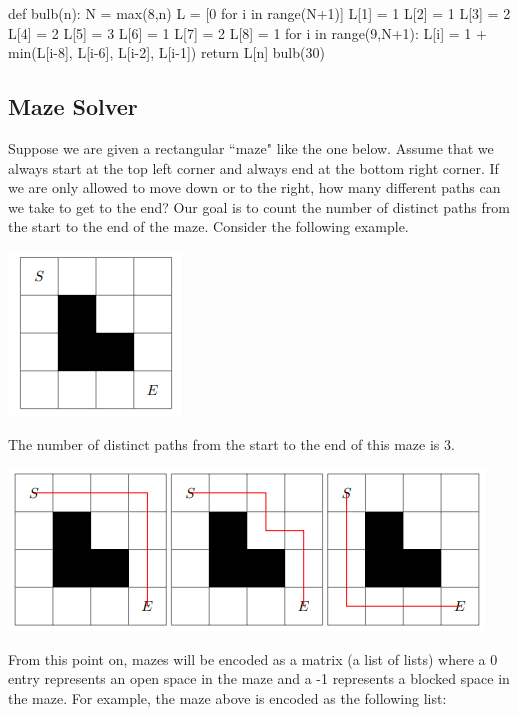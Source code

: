 \documentclass{ximera}
\begin{document}
\begin{sageCell}
def bulb(n):
        N = max(8,n)
        L = [0 for i in range(N+1)]
        L[1] = 1
        L[2] = 1
        L[3] = 2
        L[4] = 2
        L[5] = 3
        L[6] = 1
        L[7] = 2
        L[8] = 1
        for i in range(9,N+1):
                L[i] = 1 + min(L[i-8], L[i-6], L[i-2], L[i-1])
        return L[n]
bulb(30)
\end{sageCell}

\subsection{Maze Solver}

Suppose we are given a rectangular ``maze" like the one below. Assume that we always start at the top left corner and always end at the bottom right corner. If we are only allowed to move down or to the right, how many different paths can we take to get to the end? Our goal is to count the number of distinct paths from the start to the end of the maze. Consider the following example.

\begin{center}
\includegraphics{maze_example.png} 
\end{center}

The number of distinct paths from the start to the end of this maze is 3.

\begin{center}
\includegraphics{maze_example_solutions.png}
\end{center}

From this point on, mazes will be encoded as a matrix (a list of lists) where a 0 entry represents an open space in the maze and a -1 represents a blocked space in the maze. For example, the maze above is encoded as the following list:
\end{document}
